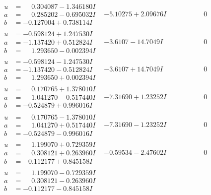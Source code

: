 \documentclass[1p]{elsarticle_modified}
\theoremstyle{definition}
\begin{document}
$$\begin{array}{c|c|c}
\begin{aligned}
u &= \phantom{-}0.304087 - 1.346180 I \\
a &= \phantom{-}0.285202 - 0.695032 I \\
b &= -0.127004 + 0.738114 I\end{aligned}
 & -5.10275 + 2.09676 I & \phantom{-0.000000 } 0 \\ \hline\begin{aligned}
u &= -0.598124 + 1.247530 I \\
a &= -1.137420 + 0.512824 I \\
b &= \phantom{-}1.293650 - 0.002394 I\end{aligned}
 & -3.6107 - 14.7049 I & \phantom{-0.000000 } 0 \\ \hline\begin{aligned}
u &= -0.598124 - 1.247530 I \\
a &= -1.137420 - 0.512824 I \\
b &= \phantom{-}1.293650 + 0.002394 I\end{aligned}
 & -3.6107 + 14.7049 I & \phantom{-0.000000 } 0 \\ \hline\begin{aligned}
u &= \phantom{-}0.170765 + 1.378010 I \\
a &= \phantom{-}1.041270 - 0.517440 I \\
b &= -0.524879 + 0.996016 I\end{aligned}
 & -7.31690 + 1.23252 I & \phantom{-0.000000 } 0 \\ \hline\begin{aligned}
u &= \phantom{-}0.170765 - 1.378010 I \\
a &= \phantom{-}1.041270 + 0.517440 I \\
b &= -0.524879 - 0.996016 I\end{aligned}
 & -7.31690 - 1.23252 I & \phantom{-0.000000 } 0 \\ \hline\begin{aligned}
u &= \phantom{-}1.199070 + 0.729359 I \\
a &= \phantom{-}0.308121 + 0.263960 I \\
b &= -0.112177 + 0.845158 I\end{aligned}
 & -0.59534 - 2.47602 I & \phantom{-0.000000 } 0 \\ \hline\begin{aligned}
u &= \phantom{-}1.199070 - 0.729359 I \\
a &= \phantom{-}0.308121 - 0.263960 I \\
b &= -0.112177 - 0.845158 I\end{aligned}

\end{array}$$
\end{document}
